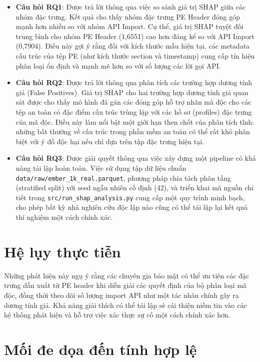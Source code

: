 \documentclass[conference]{IEEEtran}
\begin{document}
\begin{itemize}
    \item \textbf{Câu hỏi RQ1}: Được trả lời thông qua việc so sánh giá trị SHAP giữa các nhóm đặc trưng. Kết quả cho thấy nhóm đặc trưng PE Header đóng góp mạnh hơn nhiều so với nhóm API Import. Cụ thể, giá trị SHAP tuyệt đối trung bình cho nhóm PE Header (1,6551) cao hơn đáng kể so với API Import (0,7904). Điều này gợi ý rằng đối với kích thước mẫu hiện tại, các metadata cấu trúc của tệp PE (như kích thước section và timestamp) cung cấp tín hiệu phân loại ổn định và mạnh mẽ hơn so với số lượng các lời gọi API.
    
    \item \textbf{Câu hỏi RQ2}: Được trả lời thông qua phân tích các trường hợp dương tính giả (False Positives). Giá trị SHAP cho hai trường hợp dương tính giả quan sát được cho thấy mô hình đã gán các đóng góp hỗ trợ nhãn mã độc cho các tệp an toàn có đặc điểm cấu trúc trùng lặp với các hồ sơ (profiles) đặc trưng của mã độc. Điều này làm nổi bật một giới hạn then chốt của phân tích tĩnh: những bất thường về cấu trúc trong phần mềm an toàn có thể rất khó phân biệt với ý đồ độc hại nếu chỉ dựa trên tập đặc trưng hiện tại.
    
    \item \textbf{Câu hỏi RQ3}: Được giải quyết thông qua việc xây dựng một pipeline có khả năng tái lập hoàn toàn. Việc sử dụng tập dữ liệu chuẩn \texttt{data/raw/ember\_1k\_real.parquet}, phương pháp chia tách phân tầng (stratified split) với seed ngẫu nhiên cố định (42), và triển khai mã nguồn chi tiết trong \texttt{src/run\_shap\_analysis.py} cung cấp một quy trình minh bạch, cho phép bất kỳ nhà nghiên cứu độc lập nào cũng có thể tái lập lại kết quả thí nghiệm một cách chính xác.
\end{itemize}

\section{Hệ lụy thực tiễn}
Những phát hiện này ngụ ý rằng các chuyên gia bảo mật có thể ưu tiên các đặc trưng dẫn xuất từ PE header khi diễn giải các quyết định của bộ phân loại mã độc, đồng thời theo dõi số lượng import API như một tác nhân chính gây ra dương tính giả. Khả năng giải thích có thể tái lập sẽ cải thiện niềm tin vào các hệ thống phát hiện và hỗ trợ việc xác thực sự cố một cách chính xác hơn.

\section{Mối đe dọa đến tính hợp lệ}
\end{document}
